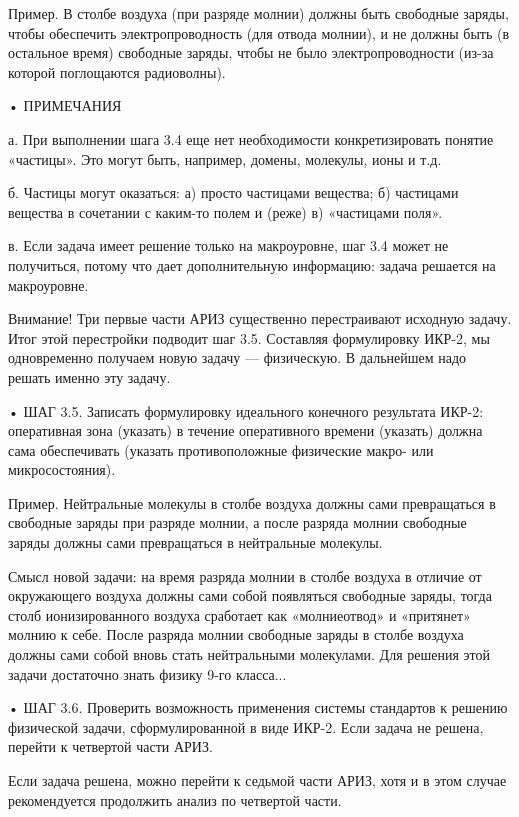 Пример. В  столбе воздуха (при  разряде молнии) должны  быть свободные
заряды, чтобы обеспечить электропроводность  (для отвода молнии), и не
должны  быть  (в остальное  время)  свободные  заряды, чтобы  не  было
электропроводности (из-за которой поглощаются радиоволны).


• ПРИМЕЧАНИЯ

а.  При выполнении  шага  3.4 еще  нет необходимости  конкретизировать
понятие «частицы». Это могут быть,  например, домены, молекулы, ионы и
т.д.

б. Частицы могут оказаться: а) просто частицами вещества; б) частицами
вещества в сочетании с каким-то полем и (реже) в) «частицами поля».

в. Если задача  имеет решение только на макроуровне, шаг  3.4 может не
получиться, потому что дает дополнительную информацию: задача решается
на макроуровне.


Внимание!  Три первые  части АРИЗ  существенно перестраивают  исходную
задачу. Итог этой перестройки подводит шаг 3.5. Составляя формулировку
ИКР-2,  мы   одновременно  получаем  новую  задачу   —  физическую.  В
дальнейшем надо решать именно эту задачу.


•  ШАГ  3.5.  Записать формулировку  идеального  конечного  результата
ИКР-2:  оперативная  зона  (указать) в  течение  оперативного  времени
(указать) должна сама обеспечивать (указать противоположные физические
макро- или микросостояния).

Пример. Нейтральные молекулы в столбе воздуха должны сами превращаться
в  свободные  заряды  при  разряде  молнии,  а  после  разряда  молнии
свободные заряды должны сами превращаться в нейтральные молекулы.


Смысл новой задачи: на время разряда молнии в столбе воздуха в отличие
от окружающего воздуха должны  сами собой появляться свободные заряды,
тогда  столб ионизированного  воздуха  сработает  как «молниеотвод»  и
«притянет»  молнию к  себе. После  разряда молнии  свободные заряды  в
столбе воздуха должны сами  собой вновь стать нейтральными молекулами.
Для решения этой задачи достаточно знать физику 9-го класса...

•  ШАГ  3.6. Проверить  возможность  применения  системы стандартов  к
решению физической задачи, сформулированной  в виде ИКР-2. Если задача
не решена, перейти к четвертой части АРИЗ.

Если задача решена, можно перейти к  седьмой части АРИЗ, хотя и в этом
случае рекомендуется продолжить анализ по четвертой части.

